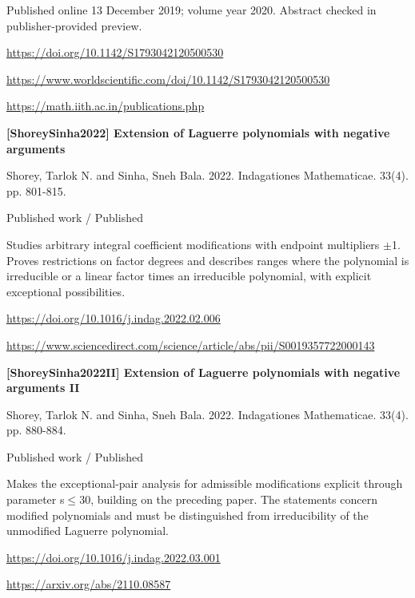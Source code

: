 \documentclass[11pt,a4paper,oneside,openany]{book}
\begin{document}
{\small Published online 13 December 2019; volume year 2020. Abstract checked in publisher-provided preview.}\par
{\footnotesize\url{https://doi.org/10.1142/S1793042120500530}}\par
{\footnotesize\url{https://www.worldscientific.com/doi/10.1142/S1793042120500530}}\par
{\footnotesize\url{https://math.iith.ac.in/publications.php}}\par
\vspace{9pt}
\hypertarget{ref:ShoreySinha2022}{}
{\sffamily\bfseries\color{atlasgreen}[ShoreySinha2022] Extension of Laguerre polynomials with negative arguments}\par
\color{black} Shorey, Tarlok N. and Sinha, Sneh Bala. 2022. Indagationes Mathematicae. 33(4). pp. 801-815.\par
{\small\sffamily\color{atlasgold}Published work / Published}\par
\color{black} Studies arbitrary integral coefficient modifications with endpoint multipliers \ensuremath{\pm}1. Proves restrictions on factor degrees and describes ranges where the polynomial is irreducible or a linear factor times an irreducible polynomial, with explicit exceptional possibilities.\par
{\footnotesize\url{https://doi.org/10.1016/j.indag.2022.02.006}}\par
{\footnotesize\url{https://www.sciencedirect.com/science/article/abs/pii/S0019357722000143}}\par
\vspace{9pt}
\hypertarget{ref:ShoreySinha2022II}{}
{\sffamily\bfseries\color{atlasgreen}[ShoreySinha2022II] Extension of Laguerre polynomials with negative arguments II}\par
\color{black} Shorey, Tarlok N. and Sinha, Sneh Bala. 2022. Indagationes Mathematicae. 33(4). pp. 880-884.\par
{\small\sffamily\color{atlasgold}Published work / Published}\par
\color{black} Makes the exceptional-pair analysis for admissible modifications explicit through parameter s\ensuremath{\le}30, building on the preceding paper. The statements concern modified polynomials and must be distinguished from irreducibility of the unmodified Laguerre polynomial.\par
{\footnotesize\url{https://doi.org/10.1016/j.indag.2022.03.001}}\par
{\footnotesize\url{https://arxiv.org/abs/2110.08587}}\par
\end{document}
